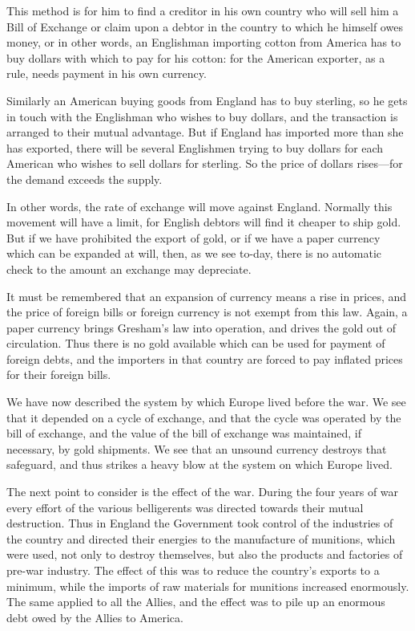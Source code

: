 \documentclass{book}
\begin{document}
This method is for him to find a creditor in his own country who will sell him a Bill of Exchange or claim upon a debtor in the country to which he himself owes money, or in other words, an Englishman importing cotton from America has to buy dollars with which to pay for his cotton: for the American exporter, as a rule, needs payment in his own currency.

Similarly an American buying goods from England has to buy sterling, so he gets in touch with the Englishman who wishes to buy dollars, and the transaction is arranged to their mutual advantage. But if England has imported more than she has exported, there will be several Englishmen trying to buy dollars for each American who wishes to sell dollars for sterling. So the price of dollars rises—for the demand exceeds the supply.

In other words, the rate of exchange will move against England. Normally this movement will have a limit, for English debtors will find it cheaper to ship gold. But if we have prohibited the export of gold, or if we have a paper currency which can be expanded at will, then, as we see to-day, there is no automatic check to the amount an exchange may depreciate.

It must be remembered that an expansion of currency means a rise in prices, and the price of foreign bills or foreign currency is not exempt from this law. Again, a paper currency brings Gresham’s law into operation, and drives the gold out of circulation. Thus there is no gold available which can be used for payment of foreign debts, and the importers in that country are forced to pay inflated prices for their foreign bills.

We have now described the system by which Europe lived before the war. We see that it depended on a cycle of exchange, and that the cycle was operated by the bill of exchange, and the value of the bill of exchange was maintained, if necessary, by gold shipments. We see that an unsound currency destroys that safeguard, and thus strikes a heavy blow at the system on which Europe lived.

The next point to consider is the effect of the war. During the four years of war every effort of the various belligerents was directed towards their mutual destruction. Thus in England the Government took control of the industries of the country and directed their energies to the manufacture of munitions, which were used, not only to destroy themselves, but also the products and factories of pre-war industry. The effect of this was to reduce the country’s exports to a minimum, while the imports of raw materials for munitions increased enormously. The same applied to all the Allies, and the effect was to pile up an enormous debt owed by the Allies to America.
\end{document}
